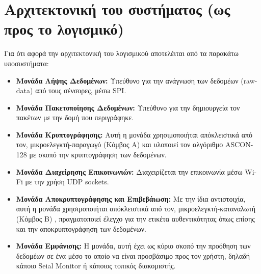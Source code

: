 \documentclass[runningheads]{llncs}
\begin{document}
\section{Αρχιτεκτονική του συστήματος (ως προς το λογισμικό)}
    Για ότι αφορά την αρχιτεκτονική του λογισμικού αποτελέιται από τα παρακάτω υποσυστήματα:

            \begin{itemize}
                \item \textbf{Μονάδα Λήψης Δεδομένων:} Υπεύθυνο για την ανάγνωση των δεδομέων (raw-data) από τους σένσορες, μέσω SPI.
                \item  \textbf{Μονάδα Πακετοποίησης Δεδομένων:} Υπεύθυνο για την δημιουργεία τον πακέτων με την δομή που περιγράφηκε.
                \item  \textbf{Μονάδα Κρυπτογράφησης:} Αυτή η μονάδα χρησιμοποιήται απόκλειστικά από τον, μικροελεγκτή-παραγωγό (Κόμβος A) 
                                                    και υλοποιεί τον αλγόριθμο ASCON-128 με σκοπό την κρυπτογράφηση των δεδομένων.
                \item \textbf{Μονάδα Διαχείρησης Επικοινωνιών:} Διαχειρίζεται την επικοινωνία μέσω Wi-Fi με την χρήση UDP sockets.
                \item \textbf{Μονάδα Αποκρυπτογράφησης και Επιβεβάιωση:} Με την ίδια αντιστοιχία, αυτή η μονάδα χρησιμοποιήται απόκλειστικά από τον, μικροελεγκτή-καταναλωτή (Κόμβος Β)
                                                                        , πραγματοποιεί έλεγχο για την ετικέτα αυθεντικότητας όπως επίσης και την αποκρυπτογράφηση των δεδομένων. 
                \item \textbf{Μονάδα Εμφάνισης:} Η μονάδα, αυτή έχει ως κύριο σκοπό την προόθηση των δεδομέων σε ένα μέσο το οποίο να είναι προσβάσιμο προς τον χρήστη, 
                                                δηλαδή κάποιο Seial Monitor ή κάποιος τοπικός διακομιστής.
            \end{itemize}
\end{document}
